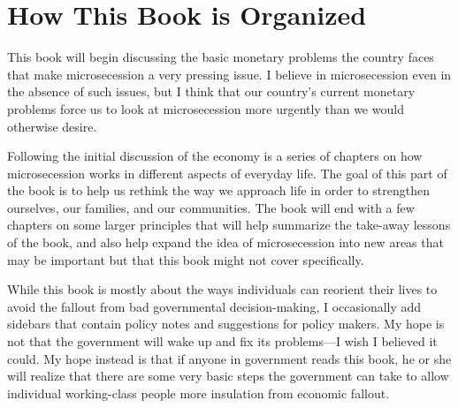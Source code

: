 \section{How This Book is Organized}
{\color{black}
This book will begin discussing the basic monetary problems the country
faces that make microsecession a very pressing issue. I believe in
microsecession even in the absence of such issues, but I think that
our country’s current
monetary problems
force us to look at
microsecession more urgently than we would otherwise desire. }

{\color{black}
Following the initial discussion of the economy is a series of chapters
on how microsecession works in different aspects of
everyday life. The
goal of this part of the book is to help us rethink the way we approach
life in order to strengthen ourselves, our families, and our
communities. The book will end with a few chapters on some larger
principles that will help summarize the take-away lessons of the book,
and also help expand the idea of microsecession into new areas
that may be important
but that this book might not cover specifically.}

{\color{black}
While this book is mostly about the ways individuals can reorient their
lives to avoid the fallout from bad governmental decision-making, I
occasionally add sidebars that contain policy notes
and suggestions for
policy makers. My hope is not that the government will wake up and fix
its problems—I wish I believed it could. My hope instead is that if
anyone in government
reads this book, he or
she will realize that there are some very basic steps
the government can
take to allow individual working-class people
more insulation from
economic fallout. }
